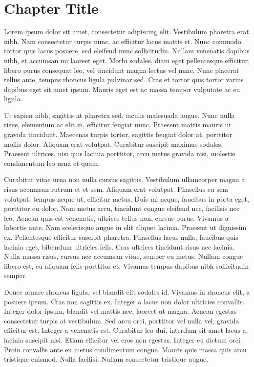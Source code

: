 \documentclass[a4paper]{memoir}
\begin{document}
\chapter{Chapter Title}
\label{chaptertwotitle}

Lorem ipsum dolor sit amet, consectetur adipiscing elit. Vestibulum pharetra erat nibh. Nam consectetur turpis nunc, ac efficitur lacus mattis et. Nunc commodo tortor quis lacus posuere, sed eleifend nunc sollicitudin. Nullam venenatis dapibus nibh, et accumsan mi laoreet eget. Morbi sodales, diam eget pellentesque efficitur, libero purus consequat leo, vel tincidunt magna lectus vel nunc. Nunc placerat tellus ante, tempus rhoncus ligula pulvinar sed. Cras et tortor quis tortor varius dapibus eget sit amet ipsum. Mauris eget est ac massa tempor vulputate ac eu ligula. 

Ut sapien nibh, sagittis at pharetra sed, iaculis malesuada augue. Nunc nulla risus, elementum ac elit in, efficitur feugiat nunc. Praesent mattis mauris ut gravida tincidunt. Maecenas turpis tortor, sagittis feugiat dolor at, porttitor mollis dolor. Aliquam erat volutpat. Curabitur suscipit maximus sodales. Praesent ultrices, nisi quis lacinia porttitor, arcu metus gravida nisi, molestie condimentum leo urna et quam. 

Curabitur vitae urna non nulla cursus sagittis. Vestibulum ullamcorper magna a risus accumsan rutrum et et sem. Aliquam erat volutpat. Phasellus eu sem volutpat, tempus neque ut, efficitur metus. Duis mi neque, faucibus in porta eget, porttitor eu dolor. Nam metus arcu, tincidunt congue eleifend nec, facilisis nec leo. Aenean quis est venenatis, ultrices tellus non, cursus purus. Vivamus a lobortis ante. Nam scelerisque augue in elit aliquet lacinia. Praesent ut dignissim ex. Pellentesque efficitur suscipit pharetra. Phasellus lacus nulla, faucibus quis lacinia eget, bibendum ultricies felis. Cras ultrices tincidunt risus nec lacinia. Nulla massa risus, cursus nec accumsan vitae, semper eu metus. Nullam congue libero est, eu aliquam felis porttitor et. Vivamus tempus dapibus nibh sollicitudin semper. 

Donec ornare rhoncus ligula, vel blandit elit sodales id. Vivamus in rhoncus elit, a posuere ipsum. Cras non sagittis ex. Integer a lacus non dolor ultricies convallis. Integer dolor ipsum, blandit vel mattis nec, laoreet ut magna. Aenean egestas consectetur turpis at vestibulum. Sed arcu orci, porttitor vel nulla vel, gravida efficitur est. Integer a venenatis est. Curabitur leo dui, interdum sit amet lacus a, lacinia suscipit nisi. Etiam efficitur vel eros non egestas. Integer eu dictum orci. Proin convallis ante eu metus condimentum congue. Mauris quis massa quis arcu tristique euismod. Nulla facilisi. Nullam consectetur tristique augue. 
\end{document}
